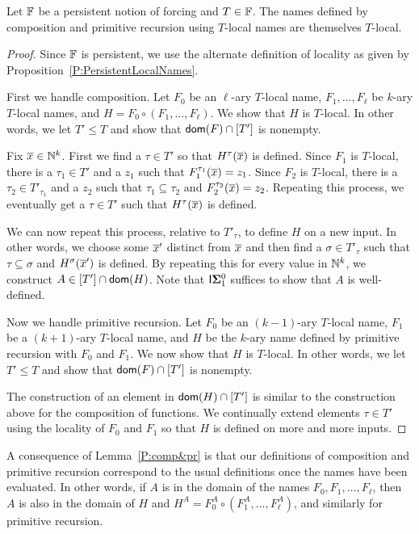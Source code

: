 \begin{prop}[$\RCAo$]\label{P:comp&pr}
Let $\mathbb{F}$ be a persistent notion of forcing and $T\in\mathbb{F}$.
The names defined by composition and primitive recursion using $T$-local names
are themselves $T$-local.
\end{prop}
\begin{proof}
Since $\mathbb{F}$ is persistent, we use the alternate definition
of locality as given by Proposition~\ref{P:PersistentLocalNames}.

First we handle composition.
Let $F_0$ be an $\ell$-ary $T$-local name, $F_1,\ldots,F_\ell$ be $k$-ary $T$-local names,
and $H=F_0\circ(F_1,\ldots,F_\ell)$.
We show that $H$ is $T$-local.
In other words, we let $T'\leq T$ and show that $\mathsf{dom}(F)\cap[T']$ is nonempty.

Fix $\overline{x}\in\mathbb{N}^k$.  First we find a $\tau\in T'$ so that $H^\tau(\overline{x})$ is  defined.
Since $F_1$ is $T$-local, there is a $\tau_1\in T'$ and a $z_1$ such that $F_1^{\tau_1}(\overline{x})=z_1$.
Since $F_2$ is $T$-local, there is a $\tau_2\in T'_{\tau_1}$ and a $z_2$ such that
$\tau_1\subseteq\tau_2$ and $F_2^{\tau_2}(\overline{x})=z_2$.
Repeating this process, we eventually get a $\tau\in T'$ such that
$H^\tau(\overline{x})$ is defined.

We can now repeat this process, relative to $T'_\tau$, to define $H$ on a new input.
In other words, we choose some $\overline{x}'$ distinct from $\overline{x}$ and then
find a $\sigma\in T'_\tau$ such that $\tau\subseteq\sigma$ and
$H^\sigma(\overline{x}')$ is defined.
By repeating this for every value in $\mathbb{N}^k$, we construct $A\in[T']\cap\mathsf{dom}(H)$.
Note that $\mathsf{I}{\mathbf{\Sigma}^0_1}$ suffices to show that $A$ is well-defined.

Now we handle primitive recursion.
Let $F_0$ be an $(k-1)$-ary $T$-local name, $F_1$ be a $(k+1)$-ary $T$-local name,
and $H$ be the $k$-ary name defined by primitive recursion with $F_0$ and $F_1$.
We now show that $H$ is $T$-local.
In other words, we let $T'\leq T$ and show that $\mathsf{dom}(F)\cap[T']$ is nonempty.

The construction of an element in $\mathsf{dom}(H)\cap[T']$ is similar
to the construction above for the composition of functions.
We continually extend elements $\tau\in T'$ using the locality of $F_0$ and $F_1$
so that $H$ is defined on more and more inputs.
\end{proof}

A consequence of Lemma~\ref{P:comp&pr} is that
our definitions of composition and primitive recursion correspond
to the usual definitions once the names have been evaluated.
In other words, if $A$ is in the domain of the names
$F_0,F_1,\ldots,F_\ell$, then $A$ is also in the domain of $H$
and $H^A=F_0^A\circ(F_1^A,\ldots,F_\ell^A)$,
and similarly for primitive recursion.

